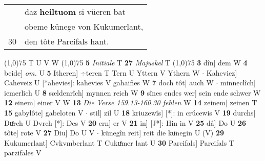 \documentclass[8pt,a4paper,notitlepage]{article}
\begin{document}
\begin{table}[ht]
\begin{minipage}[t]{0.5\linewidth}
\begin{tabular}{rl}
 & daz \textbf{heiltuom} si vüeren bat\\ 
 & obeme künege von Kukumerlant,\\ 
30 & den tôte Parcifals hant.\\ 
\end{tabular}
\scriptsize
\line(1,0){75} \newline
T U V W \newline
\line(1,0){75} \newline
\textbf{5} \textit{Initiale} T  \textbf{27} \textit{Majuskel} T  \newline
\line(1,0){75} \newline
\textbf{3} dîn] dem W \textbf{4} beide] \textit{om.} U \textbf{5} Itheren] ÷teren T Tern U Yttern V Ythern W  $\cdot$ Kaheviez] Caheveiz U [*ahevies]: kahevies V gahaifies W \textbf{7} doch tôt] auch W  $\cdot$ minneclîch] iemerlich U \textbf{8} sældenrîch] mynnen reich W \textbf{9} sînes endes wer] sein ende schwer W \textbf{12} einem] einer V W \textbf{13} \textit{Die Verse 159.13-160.30 fehlen} W  \textbf{14} zeinem] zeinen T \textbf{15} gabylôte] gabeloten V  $\cdot$ stil] zil U \textbf{18} kriuzewîs] [*]: in crúcewis V \textbf{19} durchs] Duͦrch U Dvrch [*]: Des V \textbf{20} ern] er V \textbf{21} in] [J*]: Hin in V \textbf{25} dâ] Do U \textbf{26} tôte] rote V \textbf{27} Diu] Do U V  $\cdot$ künegîn reit] reit die kuͦnegin U (V) \textbf{29} Kukumerlant] Cvkvmberlant T Cukuͦmer lant U \textbf{30} Parcifals] Parcifals T parzifales V \newline
\end{minipage}
\end{table}
\end{document}
